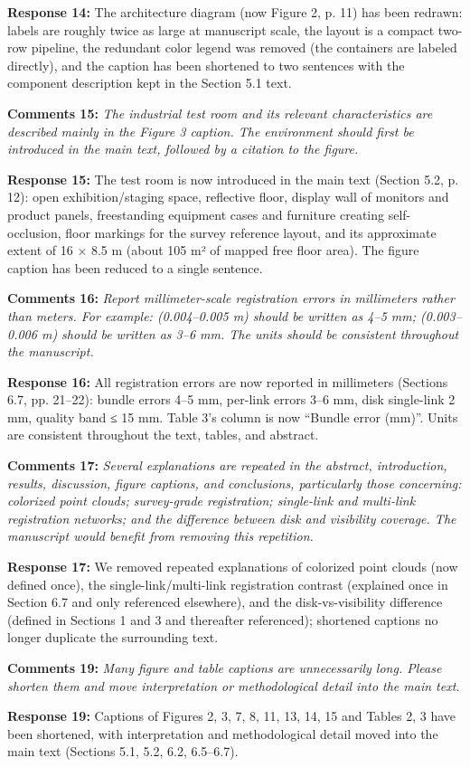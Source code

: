 \documentclass[11pt]{article}
\begin{document}
\textbf{Response 14:} The architecture diagram (now Figure 2, p. 11) has been redrawn: labels are roughly twice as large at manuscript scale, the layout is a compact two-row pipeline, the redundant color legend was removed (the containers are labeled directly), and the caption has been shortened to two sentences with the component description kept in the Section 5.1 text.

\medskip

\textbf{Comments 15:} \emph{The industrial test room and its relevant characteristics are described mainly in the Figure 3 caption. The environment should first be introduced in the main text, followed by a citation to the figure.}

\textbf{Response 15:} The test room is now introduced in the main text (Section 5.2, p. 12): open exhibition/staging space, reflective floor, display wall of monitors and product panels, freestanding equipment cases and furniture creating self-occlusion, floor markings for the survey reference layout, and its approximate extent of 16 × 8.5 m (about 105 m² of mapped free floor area). The figure caption has been reduced to a single sentence.

\medskip

\textbf{Comments 16:} \emph{Report millimeter-scale registration errors in millimeters rather than meters. For example: (0.004–0.005 m) should be written as 4–5 mm; (0.003–0.006 m) should be written as 3–6 mm. The units should be consistent throughout the manuscript.}

\textbf{Response 16:} All registration errors are now reported in millimeters (Sections 6.7, pp. 21–22): bundle errors 4–5 mm, per-link errors 3–6 mm, disk single-link 2 mm, quality band ≤ 15 mm. Table 3’s column is now “Bundle error (mm)”. Units are consistent throughout the text, tables, and abstract.

\medskip

\textbf{Comments 17:} \emph{Several explanations are repeated in the abstract, introduction, results, discussion, figure captions, and conclusions, particularly those concerning: colorized point clouds; survey-grade registration; single-link and multi-link registration networks; and the difference between disk and visibility coverage. The manuscript would benefit from removing this repetition.}

\textbf{Response 17:} We removed repeated explanations of colorized point clouds (now defined once), the single-link/multi-link registration contrast (explained once in Section 6.7 and only referenced elsewhere), and the disk-vs-visibility difference (defined in Sections 1 and 3 and thereafter referenced); shortened captions no longer duplicate the surrounding text.

\medskip

\textbf{Comments 19:} \emph{Many figure and table captions are unnecessarily long. Please shorten them and move interpretation or methodological detail into the main text.}

\textbf{Response 19:} Captions of Figures 2, 3, 7, 8, 11, 13, 14, 15 and Tables 2, 3 have been shortened, with interpretation and methodological detail moved into the main text (Sections 5.1, 5.2, 6.2, 6.5–6.7).

\medskip
\end{document}
